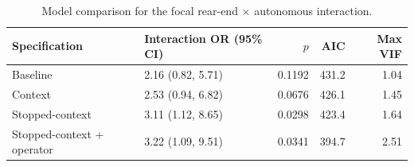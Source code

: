 \begin{table}[H]
\centering
\caption{Model comparison for the focal rear-end $\times$ autonomous interaction.}
\label{tab:model_comparison}
\scriptsize
\renewcommand{\arraystretch}{1.08}
\begin{tabular}{p{3.0cm}p{4.5cm}rrr}
\toprule
Specification & Interaction OR (95\% CI) & $p$ & AIC & Max VIF \\
\midrule
Baseline & 2.16 (0.82, 5.71) & 0.1192 & 431.2 & 1.04 \\
Context & 2.53 (0.94, 6.82) & 0.0676 & 426.1 & 1.45 \\
Stopped-context & 3.11 (1.12, 8.65) & 0.0298 & 423.4 & 1.64 \\
Stopped-context + operator & 3.22 (1.09, 9.51) & 0.0341 & 394.7 & 2.51 \\
\bottomrule
\end{tabular}
\end{table}
